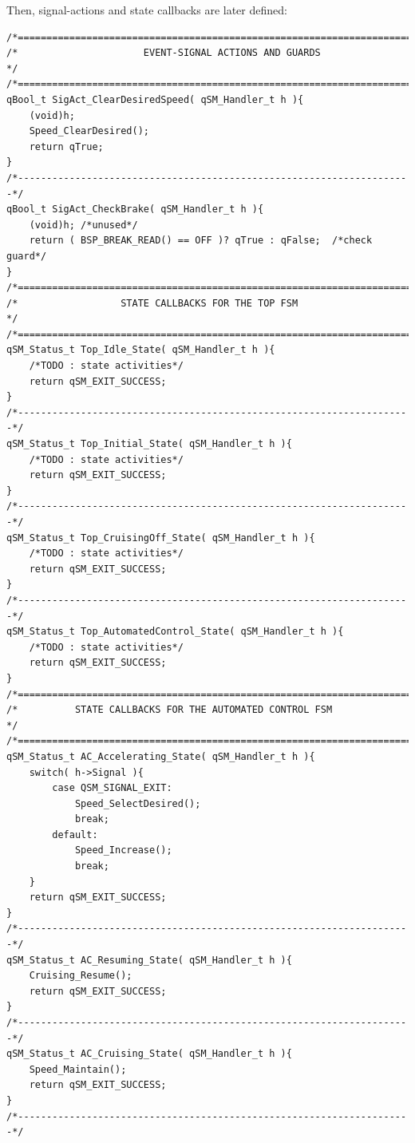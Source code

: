 \documentclass{article}
\begin{document}
Then, signal-actions and state callbacks are later defined:

\begin{lstlisting}[style=CStyle]
/*=======================================================================*/
/*                      EVENT-SIGNAL ACTIONS AND GUARDS                  */
/*=======================================================================*/
qBool_t SigAct_ClearDesiredSpeed( qSM_Handler_t h ){
    (void)h;
    Speed_ClearDesired();
    return qTrue;
}
/*---------------------------------------------------------------------*/
qBool_t SigAct_CheckBrake( qSM_Handler_t h ){
    (void)h; /*unused*/
    return ( BSP_BREAK_READ() == OFF )? qTrue : qFalse;  /*check guard*/
}
/*=======================================================================*/
/*                  STATE CALLBACKS FOR THE TOP FSM                      */
/*=======================================================================*/
qSM_Status_t Top_Idle_State( qSM_Handler_t h ){
    /*TODO : state activities*/
    return qSM_EXIT_SUCCESS;
}
/*---------------------------------------------------------------------*/
qSM_Status_t Top_Initial_State( qSM_Handler_t h ){
    /*TODO : state activities*/
    return qSM_EXIT_SUCCESS;
}
/*---------------------------------------------------------------------*/
qSM_Status_t Top_CruisingOff_State( qSM_Handler_t h ){
    /*TODO : state activities*/
    return qSM_EXIT_SUCCESS;
}
/*---------------------------------------------------------------------*/
qSM_Status_t Top_AutomatedControl_State( qSM_Handler_t h ){
    /*TODO : state activities*/
    return qSM_EXIT_SUCCESS;
}
/*=======================================================================*/
/*          STATE CALLBACKS FOR THE AUTOMATED CONTROL FSM                */
/*=======================================================================*/
qSM_Status_t AC_Accelerating_State( qSM_Handler_t h ){
    switch( h->Signal ){
        case QSM_SIGNAL_EXIT:
            Speed_SelectDesired();
            break;
        default:
            Speed_Increase();
            break;        
    }
    return qSM_EXIT_SUCCESS;
}
/*---------------------------------------------------------------------*/
qSM_Status_t AC_Resuming_State( qSM_Handler_t h ){
    Cruising_Resume();
    return qSM_EXIT_SUCCESS;
}
/*---------------------------------------------------------------------*/
qSM_Status_t AC_Cruising_State( qSM_Handler_t h ){
    Speed_Maintain();
    return qSM_EXIT_SUCCESS;
}
/*---------------------------------------------------------------------*/
\end{lstlisting}
\end{document}

